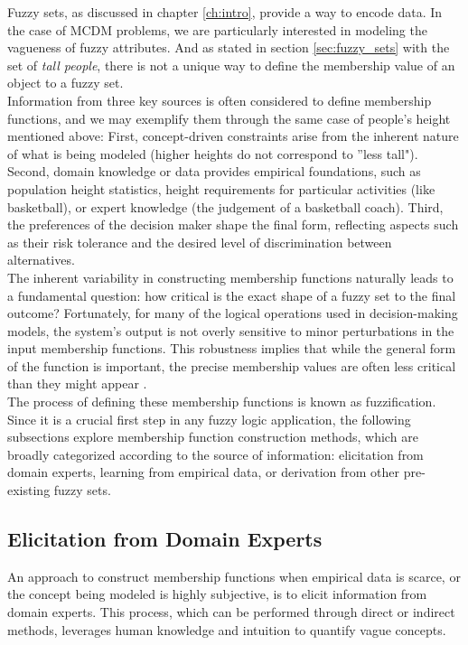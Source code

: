 Fuzzy sets, as discussed in chapter \ref{ch:intro}, provide a way to encode data. In the case of MCDM  problems, we are particularly interested in modeling the vagueness of fuzzy attributes. And as stated in section \ref{sec:fuzzy_sets} with the set of \emph{tall people}, there is not a unique way to define the membership value of an object to a fuzzy set.\\

Information from three key sources is often considered to define membership functions, and we may exemplify them through the same case of people's height mentioned above: First, concept-driven constraints arise from the inherent nature of what is being modeled (higher heights do not correspond to ''less tall"). Second, domain knowledge or data provides empirical foundations, such as population height statistics, height requirements for particular activities (like basketball), or expert knowledge (the judgement of a basketball coach). Third, the preferences of the decision maker shape the final form, reflecting aspects such as their risk tolerance and the desired level of discrimination between alternatives.\\

The inherent variability in constructing membership functions naturally leads to a fundamental question: how critical is the exact shape of a fuzzy set to the final outcome? Fortunately, for many of the logical operations used in decision-making models, the system's output is not overly sensitive to minor perturbations in the input membership functions. This robustness implies that while the general form of the function is important, the precise membership values are often less critical than they might appear \cite{ExactFuzzySetShape}.\\

The process of defining these membership functions is known as fuzzification. Since it is a crucial first step in any fuzzy logic application, the following subsections explore membership function construction methods, which are broadly categorized according to the source of information: elicitation from domain experts, learning from empirical data, or derivation from other pre-existing fuzzy sets.

\subsection{Elicitation from Domain Experts}
An approach to construct membership functions when empirical data is scarce, or the concept being modeled is highly subjective, is to elicit information from domain experts. This process, which can be performed through direct or indirect methods, leverages human knowledge and intuition to quantify vague concepts.


